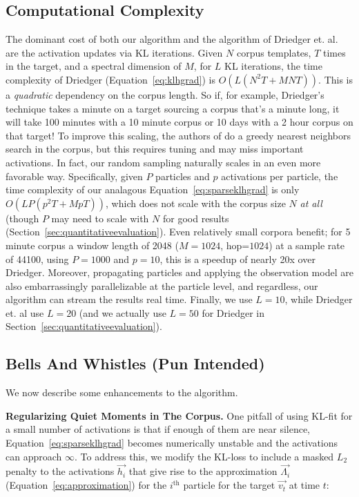 \documentclass{article}
\begin{document}
\subsection{Computational Complexity} 
\label{sec:complexity}
The dominant cost of both our algorithm and the algorithm of Driedger et. al. are the activation updates via KL iterations.  Given $N$ corpus templates, $T$ times in the target, and a spectral dimension of $M$, for $L$ KL iterations, the time complexity of Driedger (Equation~\ref{eq:klhgrad}) is $O(L(N^2T + MNT))$.  This is a {\em quadratic} dependency on the corpus length.  So if, for example, Driedger's technique takes a minute on a target sourcing a corpus that's a minute long, it will take 100 minutes with a 10 minute corpus or 10 days with a 2 hour corpus on that target!  To improve this scaling, the authors of \cite{buch2017nichtnegativematrixfaktorisierungnutzendesklangsynthesensystem} do a greedy nearest neighbors search in the corpus, but this requires tuning and may miss important activations.  In fact, our random sampling naturally scales in an even more favorable way.  Specifically, given $P$ particles and $p$ activations per particle, the time complexity of our analagous Equation~\ref{eq:sparseklhgrad} is only $O(LP(p^2T + MpT))$, which does not scale with the corpus size $N$ {\em at all} (though $P$ may need to scale with $N$ for good results (Section~\ref{sec:quantitativeevaluation}).  Even relatively small corpora benefit; for 5 minute corpus a window length of 2048 ($M=1024$, hop=$1024$) at a sample rate of 44100, using $P=1000$ and $p=10$, this is a speedup of nearly 20x over Driedger.  Moreover, propagating particles and applying the observation model are also embarrassingly parallelizable at the particle level, and regardless, our algorithm can stream the results real time.  Finally, we use $L=10$, while Driedger et. al use $L=20$ \cite{driedger2015let} (and we actually use $L=50$ for Driedger in Section~\ref{sec:quantitativeevaluation}).


\subsection{Bells And Whistles (Pun Intended)}

We now describe some enhancements to the algorithm.



\textbf{Regularizing Quiet Moments in The Corpus.} One pitfall of using KL-fit for a small number of activations is that if enough of them are near silence, Equation~\ref{eq:sparseklhgrad} becomes numerically unstable and the activations can approach $\infty$.  To address this, we modify the KL-loss to include a masked $L_2$ penalty to the activations $\vec{h_i}$ that give rise to the approximation $\vec{\Lambda_i}$ (Equation~\ref{eq:approximation}) for the $i^{\text{th}}$ particle for the target $\vec{v_t}$ at time $t$:
\end{document}
